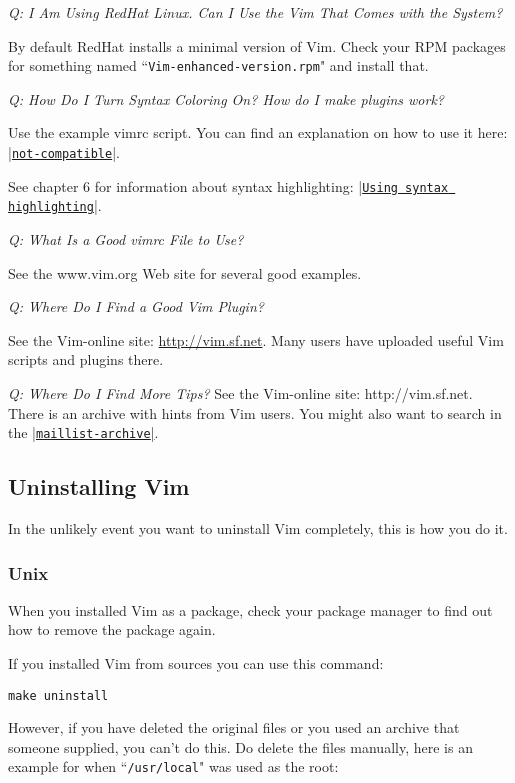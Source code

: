 \textit{Q: I Am Using RedHat Linux.  Can I Use the Vim That Comes with the System?}

By default RedHat installs a minimal version of Vim.
Check your RPM packages for something named ``\texttt{Vim-enhanced-version.rpm}" and install that.

\textit{Q: How Do I Turn Syntax Coloring On?  How do I make plugins work?}

Use the example vimrc script.
You can find an explanation on how to use it here: \hyperref[not-compatible]{|\texttt{not-compatible}|}.

See chapter 6 for information about syntax highlighting: |\hyperref[Using syntax highlighting]{\texttt{Using syntax highlighting}}|.

\textit{Q: What Is a Good vimrc File to Use?}

See the www.vim.org Web site for several good examples.

\textit{Q: Where Do I Find a Good Vim Plugin?}

See the Vim-online site: \url{http://vim.sf.net}.
Many users have uploaded useful Vim scripts and plugins there.

\textit{Q: Where Do I Find More Tips?}
See the Vim-online site:   http://vim.sf.net. There is an archive with hints from Vim users.
You might also want to search in the \hyperref[maillist-archive]{|\texttt{maillist-archive}|}.
\subsection{Uninstalling Vim}
\label{Uninstalling Vim}
In the unlikely event you want to uninstall Vim completely, this is how you do it.
\subsubsection{Unix}
When you installed Vim as a package, check your package manager to find out how to remove the package again.

If you installed Vim from sources you can use this command:

\begin{Verbatim}[samepage=true]
 make uninstall
\end{Verbatim}

However, if you have deleted the original files or you used an archive that someone supplied, you can't do this.
Do delete the files manually, here is an example for when ``\texttt{/usr/local}" was used as the root:

